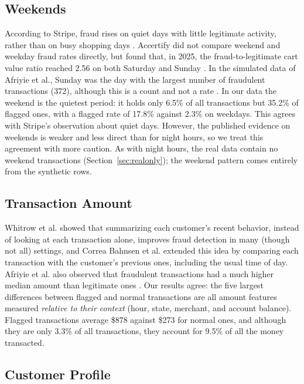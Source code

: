 \documentclass[journal]{IEEEtran}
\begin{document}
\subsection{Weekends}

According to Stripe, fraud rises on quiet days with little legitimate activity, rather than on busy shopping days \cite{woodward2017stripe}. Accertify did not compare weekend and weekday fraud rates directly, but found that, in 2025, the fraud-to-legitimate cart value ratio reached 2.56 on both Saturday and Sunday \cite{accertify2026cyber}. In the simulated data of Afriyie et al., Sunday was the day with the largest number of fraudulent transactions (372), although this is a count and not a rate \cite{afriyie2023supervised}. In our data the weekend is the quietest period: it holds only 6.5\% of all transactions but 35.2\% of flagged ones, with a flagged rate of 17.8\% against 2.3\% on weekdays. This agrees with Stripe's observation about quiet days. However, the published evidence on weekends is weaker and less direct than for night hours, so we treat this agreement with more caution. As with night hours, the real data contain no weekend transactions (Section~\ref{sec:realonly}); the weekend pattern comes entirely from the synthetic rows.

\subsection{Transaction Amount}

Whitrow et al. \cite{whitrow2009aggregation} showed that summarizing each customer's recent behavior, instead of looking at each transaction alone, improves fraud detection in many (though not all) settings, and Correa Bahnsen et al. \cite{bahnsen2016feature} extended this idea by comparing each transaction with the customer's previous ones, including the usual time of day. Afriyie et al. also observed that fraudulent transactions had a much higher median amount than legitimate ones \cite{afriyie2023supervised}. Our results agree: the five largest differences between flagged and normal transactions are all amount features measured \emph{relative to their context} (hour, state, merchant, and account balance). Flagged transactions average \$878 against \$273 for normal ones, and although they are only 3.3\% of all transactions, they account for 9.5\% of all the money transacted.

\subsection{Customer Profile}
\end{document}
